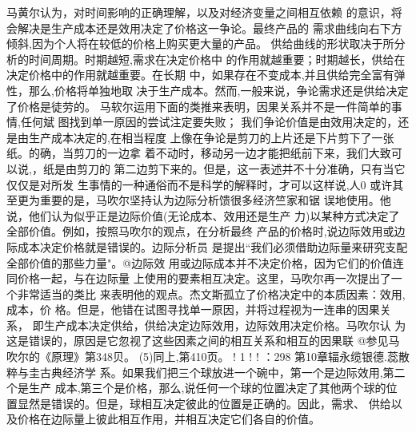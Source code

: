 马黄尔认为，对时间影响的正确理解，以及对经济变量之间相互依赖
的意识，将会解决是生产成本还是效用决定了价格这一争论。最终产品的
需求曲线向右下方倾斜,因为个人将在较低的价格上购买更大量的产品。
供给曲线的形状取决于所分析的时间周期。时期越短,需求在决定价格中
的作用就越重要；时期越长，供给在决定价格中的作用就越重要。在长期
中，如果存在不变成本,并且供给完全富有弹性，那么,价格将单独地取
决于生产成本。然而,一般来说，争论需求还是供给决定了价格是徒劳的。
马软尔运用下面的类推来表明，因果关系并不是一件简单的事情,任何斌
图找到单一原因的尝试注定要失败；
我们争论价值是由效用决定的，还是由生产成本决定的,在相当程度
上像在争论是剪刀的上片还是下片剪下了一张纸。的确，当剪刀的一边拿
着不动时，移动另一边才能把纸前下来，我们大致可以说,，纸是由剪刀的
第二边剪下来的。但是，这一表述并不十分准确，只有当它仅仅是对所发
生事情的一种通俗而不是科学的解释时，才可以这样说,人0
或许其至更为重要的是，马吹尔坚持认为边际分析馈很多经济竺家和锯
误地使用。他说，他们认为似乎正是边际价值(无论成本、效用还是生产
力)以某种方式决定了全部价值。例如，按照马吹尔的观点，在分析最终
产品的价格时,说边际效用或边际成本决定价格就是错误的。边际分析员
是提出“我们必须借助边际量来研究支配全部价值的那些力量"。@边际效
用或边际成本并不决定价格，因为它们的价值连同价格一起，与在边际量
上使用的要素相互决定。这里，马吹尔再一次提出了一个非常适当的类比
来表明他的观点。杰文斯孤立了价格决定中的本质因素：效用,成本，价
格。但是，他错在试图寻找单一原因，并将过程视为一连串的因果关系，
即生产成本决定供给，供给决定边际效用，边际效用决定价格。马吹尔认
为这是错误的，原因是它忽视了这些因素之间的相互关系和相互的因果联
@参见马吹尔的《原理》第348贝。
(5)同上,第410页。
!
1
!
!
：298
第10章辐永缆银德.蕊散粹与圭古典经济学
系。如果我们把三个球放进一个碗中，第一个是边际效用,第二个是生产
成本,第三个是价格，那么,说任何一个球的位置决定了其他两个球的位
置显然是错误的。但是，球相互决定彼此的位置是正确的。因此，需求、
供给以及价格在边际量上彼此相互作用，并相互决定它们各自的价值。

